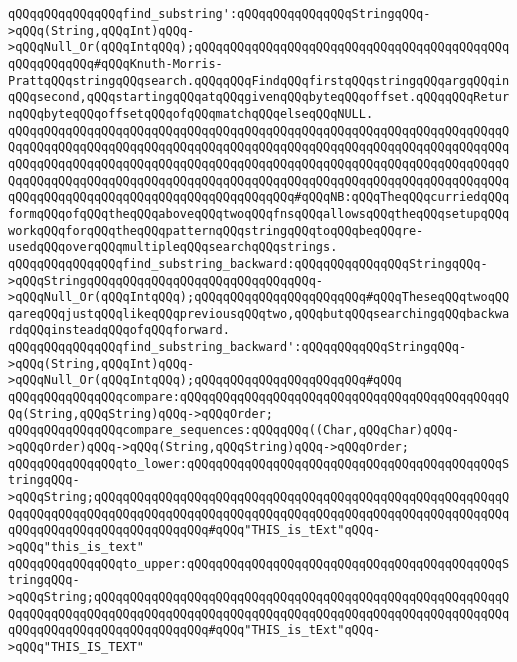 \verb|qQQqqQQqqQQqqQQqfind_substring':qQQqqQQqqQQqqQQqStringqQQq->qQQq(String,qQQqInt)qQQq->qQQqNull_Or(qQQqIntqQQq);qQQqqQQqqQQqqQQqqQQqqQQqqQQqqQQqqQQqqQQqqQQqqQQqqQQqqQQq#qQQqKnuth-Morris-PrattqQQqstringqQQqsearch.qQQqqQQqFindqQQqfirstqQQqstringqQQqargqQQqinqQQqsecond,qQQqstartingqQQqatqQQqgivenqQQqbyteqQQqoffset.qQQqqQQqReturnqQQqbyteqQQqoffsetqQQqofqQQqmatchqQQqelseqQQqNULL.|\newline
\verb|qQQqqQQqqQQqqQQqqQQqqQQqqQQqqQQqqQQqqQQqqQQqqQQqqQQqqQQqqQQqqQQqqQQqqQQqqQQqqQQqqQQqqQQqqQQqqQQqqQQqqQQqqQQqqQQqqQQqqQQqqQQqqQQqqQQqqQQqqQQqqQQqqQQqqQQqqQQqqQQqqQQqqQQqqQQqqQQqqQQqqQQqqQQqqQQqqQQqqQQqqQQqqQQqqQQqqQQqqQQqqQQqqQQqqQQqqQQqqQQqqQQqqQQqqQQqqQQqqQQqqQQqqQQqqQQqqQQqqQQqqQQqqQQqqQQqqQQqqQQqqQQqqQQqqQQqqQQqqQQq#qQQqNB:qQQqTheqQQqcurriedqQQqformqQQqofqQQqtheqQQqaboveqQQqtwoqQQqfnsqQQqallowsqQQqtheqQQqsetupqQQqworkqQQqforqQQqtheqQQqpatternqQQqstringqQQqtoqQQqbeqQQqre-usedqQQqoverqQQqmultipleqQQqsearchqQQqstrings.|\newline
\verb|qQQqqQQqqQQqqQQqfind_substring_backward:qQQqqQQqqQQqqQQqStringqQQq->qQQqStringqQQqqQQqqQQqqQQqqQQqqQQqqQQqqQQq->qQQqNull_Or(qQQqIntqQQq);qQQqqQQqqQQqqQQqqQQqqQQq#qQQqTheseqQQqtwoqQQqareqQQqjustqQQqlikeqQQqpreviousqQQqtwo,qQQqbutqQQqsearchingqQQqbackwardqQQqinsteadqQQqofqQQqforward.|\newline
\verb|qQQqqQQqqQQqqQQqfind_substring_backward':qQQqqQQqqQQqStringqQQq->qQQq(String,qQQqInt)qQQq->qQQqNull_Or(qQQqIntqQQq);qQQqqQQqqQQqqQQqqQQqqQQq#qQQq|\newline
\newline
\verb|qQQqqQQqqQQqqQQqcompare:qQQqqQQqqQQqqQQqqQQqqQQqqQQqqQQqqQQqqQQqqQQqqQQq(String,qQQqString)qQQq->qQQqOrder;|\newline
\verb|qQQqqQQqqQQqqQQqcompare_sequences:qQQqqQQq((Char,qQQqChar)qQQq->qQQqOrder)qQQq->qQQq(String,qQQqString)qQQq->qQQqOrder;|\newline
\newline
\verb|qQQqqQQqqQQqqQQqto_lower:qQQqqQQqqQQqqQQqqQQqqQQqqQQqqQQqqQQqqQQqqQQqStringqQQq->qQQqString;qQQqqQQqqQQqqQQqqQQqqQQqqQQqqQQqqQQqqQQqqQQqqQQqqQQqqQQqqQQqqQQqqQQqqQQqqQQqqQQqqQQqqQQqqQQqqQQqqQQqqQQqqQQqqQQqqQQqqQQqqQQqqQQqqQQqqQQqqQQqqQQqqQQqqQQqqQQq#qQQq"THIS_is_tExt"qQQq->qQQq"this_is_text"|\newline
\verb|qQQqqQQqqQQqqQQqto_upper:qQQqqQQqqQQqqQQqqQQqqQQqqQQqqQQqqQQqqQQqqQQqStringqQQq->qQQqString;qQQqqQQqqQQqqQQqqQQqqQQqqQQqqQQqqQQqqQQqqQQqqQQqqQQqqQQqqQQqqQQqqQQqqQQqqQQqqQQqqQQqqQQqqQQqqQQqqQQqqQQqqQQqqQQqqQQqqQQqqQQqqQQqqQQqqQQqqQQqqQQqqQQqqQQqqQQq#qQQq"THIS_is_tExt"qQQq->qQQq"THIS_IS_TEXT"|\newline
